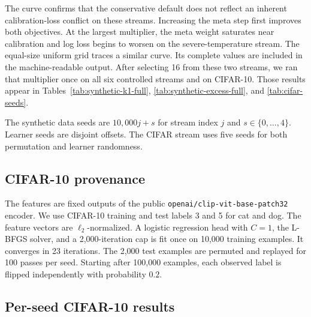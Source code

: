 \documentclass{article}
\begin{document}
The curve confirms that the conservative default does not reflect an inherent calibration-loss conflict on these streams. Increasing the meta step first improves both objectives. At the largest multiplier, the meta weight saturates near calibration and log loss begins to worsen on the severe-temperature stream. The equal-size uniform grid traces a similar curve. Its complete values are included in the machine-readable output. After selecting 16 from these two streams, we ran that multiplier once on all six controlled streams and on CIFAR-10. Those results appear in Tables~\ref{tab:synthetic-k1-full}, \ref{tab:synthetic-excess-full}, and \ref{tab:cifar-seeds}.

The synthetic data seeds are $10{,}000j+s$ for stream index $j$ and $s\in\{0,\ldots,4\}$. Learner seeds are disjoint offsets. The CIFAR stream uses five seeds for both permutation and learner randomness.

\subsection{CIFAR-10 provenance}

The features are fixed outputs of the public \texttt{openai/clip-vit-base-patch32} encoder. We use CIFAR-10 training and test labels 3 and 5 for cat and dog. The feature vectors are $\ell_2$-normalized. A logistic regression head with $C=1$, the L-BFGS solver, and a 2,000-iteration cap is fit once on 10,000 training examples. It converges in 23 iterations. The 2,000 test examples are permuted and replayed for 100 passes per seed. Starting after 100,000 examples, each observed label is flipped independently with probability $0.2$.

\subsection{Per-seed CIFAR-10 results}
\end{document}

